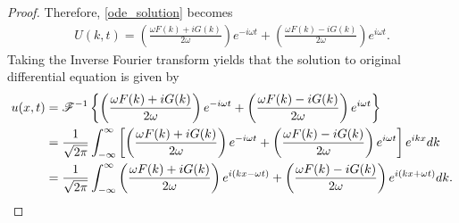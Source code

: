 \begin{proof}
  Therefore, \eqref{ode_solution} becomes
  \begin{align*}
    U(k, t) = \left(\frac{\omega F(k) + i G(k)}{2\omega}\right)e^{-i\omega t} + \left(\frac{\omega F(k) - i G(k)}{2\omega}\right)e^{i\omega t}.
  \end{align*}
  Taking the Inverse Fourier transform yields that the solution to original differential equation is given by
  \begin{align*}
    u(x, t) &= \mathscr{F}^{-1}\left\{ {\left(\frac{\omega F(k) + i G(k)}{2\omega}\right)e^{-i\omega t} + \left(\frac{\omega F(k) - i G(k)}{2\omega}\right)e^{i\omega t}} \right\} \\
    &= \frac{1}{\sqrt{2\pi}}\int_{-\infty}^\infty \left[\left(\frac{\omega F(k) + i G(k)}{2\omega}\right)e^{-i\omega t} + \left(\frac{\omega F(k) - i G(k)}{2\omega}\right)e^{i\omega t}\right] e^{ikx} dk \\
    &= \frac{1}{\sqrt{2\pi}}\int_{-\infty}^\infty \left(\frac{\omega F(k) + i G(k)}{2\omega}\right)e^{i(kx-\omega t)} + \left(\frac{\omega F(k) - i G(k)}{2\omega}\right)e^{i(kx + \omega t)}dk.
  \end{align*}



\end{proof}
\newpage
